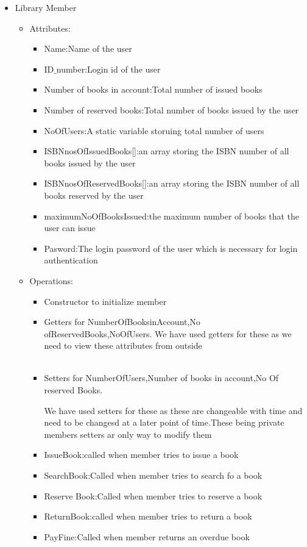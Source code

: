 \documentclass[a4paper]{article}
\begin{document}
\begin{itemize}
\item Library Member 
\begin{itemize}
\item Attributes:
\begin{itemize}
\item Name:Name of the user
\item ID$\_$number:Login id of the user
\item Number of books in account:Total number of issued books
\item Number of reserved books:Total number of books issued by the user
\item NoOfUsers:A static variable storuing total number of users
\item ISBNnosOfIssuedBooks[]:an array storing the ISBN number of all books issued by the user
\item ISBNnosOfReservedBooks[]:an array storing the ISBN number of all books reserved by the user
\item maximumNoOfBooksIssued:the maximum number of books that the user can issue
\item Pasword:The login password of the user which is necessary for login authentication
\end{itemize}

\item Operations:
\begin{itemize}

\item Constructor to initialize member\\
\item Getters for NumberOfBooksinAccount,No ofReservedBooks,NoOfUsers.
We have used getters for these as we need to view these attributes from outside \\\
\item Setters for NumberOfUsers,Number of books in account,No Of reserved Books.


We have used setters for these as these are changeable with time and need to be changesd at a later point of time.These being private members setters ar only way to modify them
\\
\item IssueBook:called when member tries to issue a book\\
\item SearchBook:Called when member tries to search fo a book\\
\item Reserve Book:Called when member tries to reserve a book\\
\item ReturnBook:called when member tries to return a book\\
\item PayFine:Called when member returns an overdue book\\


\end{itemize}
\end{itemize}
\end{itemize}
\end{document}
